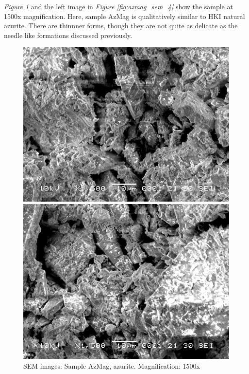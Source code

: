 \textit{Figure \ref{fig:azmag_sem_3}} and the left image in \textit{Figure \ref{fig:azmag_sem_4}} show the sample at 1500x magnification. Here, sample AzMag is qualitatively similar to HKI natural azurite. There are thinnner forms, though they are not quite as delicate as the needle like formations discussed previously. 


\begin{figure}[H]
\centering
\begin{minipage}{.45\textwidth}
  \centering
  \includegraphics[width=\linewidth]{AzMag_x1500_1_160321}
\end{minipage}
\begin{minipage}{.45\textwidth}
  \centering
  \includegraphics[width=\linewidth]{AzMag_x1500_3_160321}
\end{minipage}
\caption[SEM images: Sample AzMag, azurite]{SEM images: Sample AzMag, azurite. Magnification: 1500x}
\label{fig:azmag_sem_3}
\end{figure}

